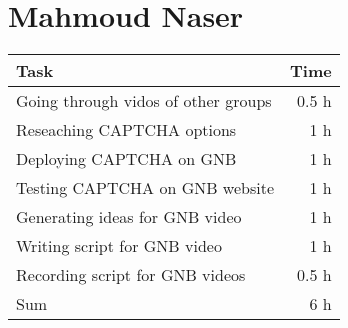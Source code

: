 \clearpage
\section*{Mahmoud Naser}
\begin{table}[h!tpb]
  \centering
  \begin{tabularx}{\textwidth}{X r}
    \toprule
      Task & Time \\
    \midrule
      Going through vidos of other groups & 0.5 h \\
      Reseaching CAPTCHA options & 1 h \\
      Deploying CAPTCHA on GNB & 1 h \\
      Testing CAPTCHA on GNB website & 1 h \\
      Generating ideas for GNB video & 1 h \\
      Writing script for GNB video & 1 h \\
      Recording script for GNB videos & 0.5 h\\ 
    \midrule
      Sum & 6 h \\
    \bottomrule
  \end{tabularx}
\end{table}

